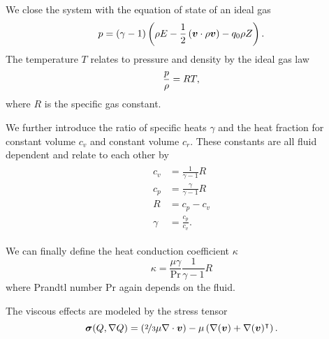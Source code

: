 We close the system with the equation of state of an ideal gas
\begin{equation}
  \label{eq:eos}
  p = (\gamma - 1) \left(\rho E - \frac{1}{2} \left(\bm{v} \cdot \rho \bm{v} \right)  - q_0 \rho Z \right).
\end{equation}
The temperature $T$ relates to pressure and density by the ideal gas law
\begin{equation}
  \label{eq:temperature}
 \frac{p}{\rho} = RT,
\end{equation}
where $R$ is the specific gas constant.

We further introduce the ratio of specific heats $\gamma$ and the heat fraction for constant volume $c_v$ and constant volume $c_r$.
These constants are all fluid dependent and relate to each other by
\begin{align}
  \begin{split}
  c_v &= \frac{1}{\gamma - 1} R \\
  c_p &= \frac{\gamma}{\gamma - 1} R\\
  R &= c_p - c_v\\
  \gamma &= \frac{c_p}{c_v}.
  \end{split}
\end{align}

We can finally define the heat conduction coefficient $\kappa$
\begin{equation}
  \label{eq:heat-conduction-coeff}
  \kappa = \frac{\mu \gamma}{\Pr} \frac{1}{\gamma - 1} R
\end{equation}
where Prandtl number $\text{Pr}$ again depends on the fluid.


The viscous effects are modeled by the stress tensor
\begin{equation}
  \label{eq:stress-tensor}
  \bm{\sigma}(Q, \nabla Q) = \left(\nicefrac{2}{3} \mu \nabla \cdot \bm{v} \right) -
  \mu \left( \nabla (\bm{v}) + \nabla ( \bm{v} )^\intercal \right).
\end{equation}

